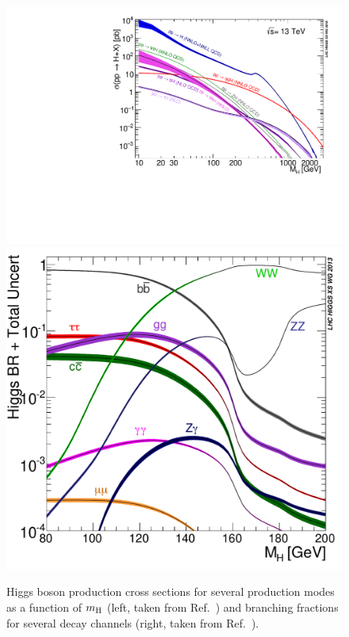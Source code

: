 \begin{figure}[hbtp]
  \begin{center}
    \includegraphics[width=\halflinewidth]{img/theory/mh_production.pdf}
    \includegraphics[width=\halflinewidth]{img/theory/mh_decay.pdf}
    \caption{
        Higgs boson production cross sections for several production modes as a function of $m_{\mathrm{H}}$ (left, taken from Ref.~\cite{deFlorian:2016spz}) and branching fractions for several decay channels (right, taken from Ref.~\cite{LHCHXSWG:YR3}).
        }
    \label{fig:mh-production-decay}
  \end{center}
\end{figure}



